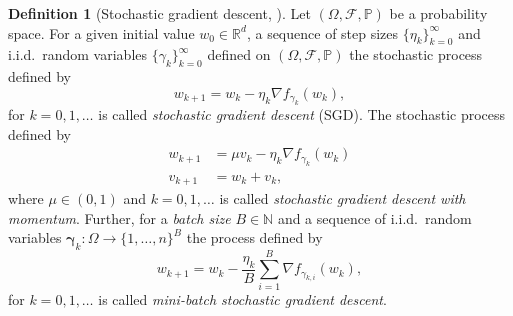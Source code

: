 \documentclass[12pt]{article}
\theoremstyle{definition}
\newtheorem{definition}[definition]{Definition}
\numberwithin{equation}{section}
\newcommand{\N}{\mathbb{N}}
\newcommand{\R}{\mathbb{R}}
\newcommand{\BP}{\mathbb{P}}
\newcommand{\CF}{\mathcal{F}}
\begin{document}
\begin{definition}[Stochastic gradient descent, ]
  \label{def:sgd}
 Let $(\Omega, \CF, \BP)$ be a probability space. For a given initial value $w_{0} \in \R^d$, a sequence of step sizes $\{\eta_k\}_{k=0}^\infty$ and i.i.d.\ random variables $\{\gamma_{k}\}_{k=0}^\infty$ defined on $(\Omega, \CF, \BP)$ the stochastic process defined by
  \begin{equation}
    \label{eq:stochastic_gradient_descent}
    w_{k+1} = w_{k} - \eta_k \nabla f_{\gamma_{k}}(w_{k}),
  \end{equation}
  for $k=0,1,\dots$ is called \emph{stochastic gradient descent} (SGD).
  The stochastic process defined by
  \begin{align*}
    w_{k+1} &= \mu v_{k} - \eta_k \nabla f_{\gamma_{k}}(w_{k}) \\
    v_{k+1} &= w_{k} + v_{k},
  \end{align*}
  where $\mu \in (0,1)$ and $k=0,1,\dots$ is called \emph{stochastic gradient descent with momentum}. Further, for a \emph{batch size} $B \in \N$ and a sequence of i.i.d.\ random variables $\bm{\gamma}_k:\Omega \rightarrow \{1,\dots,n\}^B$ the process defined by
  \begin{equation}
    \label{eq:mini_batch_sgd}
    w_{k+1} = w_k - \frac{\eta_k}{B}\sum_{i=1}^B \nabla f_{\gamma_{k,i}}(w_k),
  \end{equation}
  for $k=0,1,\dots$ is called \emph{mini-batch stochastic gradient descent}.
\end{definition}
\end{document}
